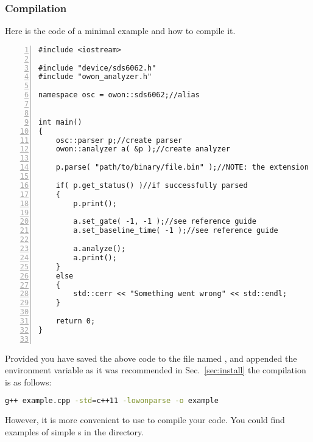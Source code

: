 \subsubsection{Compilation}
Here is the code of a minimal example and how to compile it.
\begin{lstlisting}[numbers=left]
#include <iostream>

#include "device/sds6062.h"
#include "owon_analyzer.h"

namespace osc = owon::sds6062;//alias


int main()
{
    osc::parser p;//create parser
    owon::analyzer a( &p );//create analyzer
    
    p.parse( "path/to/binary/file.bin" );//NOTE: the extension is present
    
    if( p.get_status() )//if successfully parsed
    {
        p.print();
    
        a.set_gate( -1, -1 );//see reference guide
        a.set_baseline_time( -1 );//see reference guide
    
        a.analyze();
        a.print();
    }
    else
    {
        std::cerr << "Something went wrong" << std::endl;
    }
    
    return 0;
}
    
\end{lstlisting}
Provided you have saved the above code to the file named , and
appended the  environment variable as it was
recommended in Sec.~\ref{sec:install} the compilation is as follows:
\begin{lstlisting}[language=bash]
g++ example.cpp -std=c++11 -lowonparse -o example
\end{lstlisting}
However, it is more convenient to use  to compile your code.
You could find examples of simple s in the
 directory.

